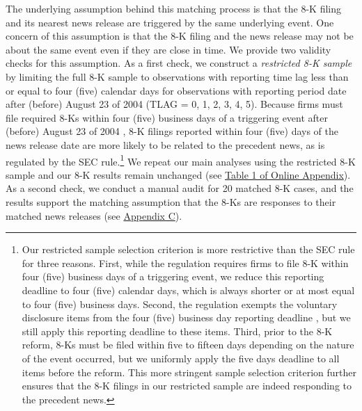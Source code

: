 \documentclass[letterpaper,11pt]{article}
\begin{document}
\begin{spacing}{1.5}
The underlying assumption behind this matching process is that the 8-K filing and its nearest news release are triggered by the same underlying event. One concern of this assumption is that the 8-K filing and the news release may not be about the same event even if they are close in time. We provide two validity checks for this assumption. As a first check, we construct a \textit{restricted 8-K sample} by limiting the full 8-K sample to observations with reporting time lag less than or equal to four (five) calendar days for observations with reporting period date after (before) August 23 of 2004 (TLAG = 0, 1, 2, 3, 4, 5). Because firms must file required 8-Ks within four (five) business days of a triggering event after (before) August 23 of 2004 \cite{secFinalRuleAdditional2004}, 8-K filings reported within four (five) days of the news release date are more likely to be related to the precedent news, as is regulated by the SEC rule.\footnote{Our restricted sample selection criterion is more restrictive than the SEC rule for three reasons. First, while the regulation requires firms to file 8-K within four (five) business days of a triggering event, we reduce this reporting deadline to four (five) calendar days, which is always shorter or at most equal to four (five) business days. Second, the regulation exempts the voluntary disclosure items from the four (five) business day reporting deadline \cite{heMeasuringDisclosureUsing2020}, but we still apply this reporting deadline to these items. Third, prior to the 8-K reform, 8-Ks must be filed within five to fifteen days depending on the nature of the event occurred, but we uniformly apply the five days deadline to all items before the reform. This more stringent sample selection criterion further ensures that the 8-K filings in our restricted sample are indeed responding to the precedent news.} We repeat our main analyses using the restricted 8-K sample and our 8-K results remain unchanged (see \hyperref[oat1]{Table 1 of Online Appendix}). As a second check, we conduct a manual audit for 20 matched 8-K cases, and the results support the matching assumption that the 8-Ks are responses to their matched news releases (see \hyperref[appc]{Appendix C}).


\end{spacing}
\end{document}
